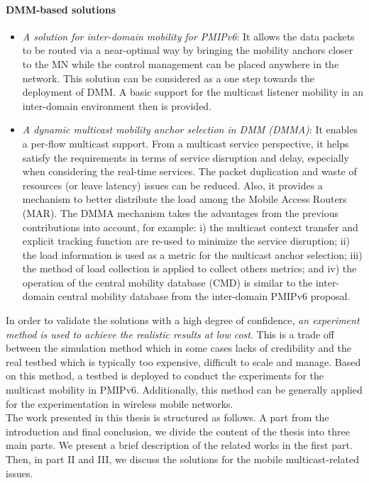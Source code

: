 \paragraph{DMM-based solutions}
\begin{itemize}
\item \textit{A solution for inter-domain mobility for PMIPv6}: It allows the data packets to be routed via a near-optimal way by bringing the mobility anchors closer to the MN while the control management can be placed anywhere in the network. This solution can be considered as a one step towards the deployment of DMM. A basic support for the multicast listener mobility in an inter-domain environment then is provided.  

\item \textit{A dynamic multicast mobility anchor selection in DMM (DMMA)}: It enables a per-flow multicast support. From a multicast service perspective, it helps satisfy the requirements in terms of service disruption and delay, especially when considering the real-time services. The packet duplication and waste of resources (or leave latency) issues can be reduced. Also, it provides a mechanism to better distribute the load among the Mobile Access Routers (MAR). The DMMA mechanism takes the advantages from the previous contributions into account, for example: i) the multicast context transfer and explicit tracking function are re-used to minimize the service disruption; ii) the load information is used as a metric for the multicast anchor selection; iii) the method of load collection is applied to collect others metrics; and iv) the operation of the central mobility database (CMD) is similar to the inter-domain central mobility database from the inter-domain PMIPv6 proposal. 
\end{itemize}

In order to validate the solutions with a high degree of confidence, \textit{an experiment method is used to achieve the realistic results at low cost}. This is a trade off between the simulation method which in some cases lacks of credibility and the real testbed which is typically too expensive, difficult to scale and manage. Based on this method, a testbed is deployed to conduct the experiments for the multicast mobility in PMIPv6. Additionally, this method can be generally applied for the experimentation in wireless mobile networks.  \\

The work presented in this thesis is structured as follows. A part from the introduction and final conclusion, we divide the content of the thesis into three main parts. We present a brief description of the related works in the first part. Then, in part II and III, we discuss the solutions for the mobile multicast-related issues.

